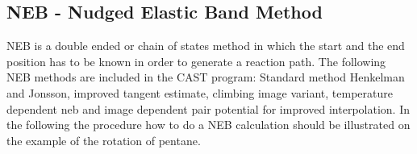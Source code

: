 \documentclass[10pt,a4paper]{article} %
\begin{document}
	\subsection{NEB - Nudged Elastic Band Method}	
NEB is a double ended or chain of states method in which the start and the end position has to be known in order to generate a reaction path. 
The following NEB methods are included in the CAST program: Standard method Henkelman and Jonsson\supercite{JonssonH.1998}, improved tangent estimate\supercite{Henkelman2000}, climbing image variant\supercite{Henkelman2000a}, temperature dependent neb\supercite{Crehuet2003} and image dependent pair potential for improved interpolation\supercite{Smidstrup2014}.
In the following the procedure how to do a NEB calculation should be illustrated on the example of the rotation of pentane.\newline
\end{document}
